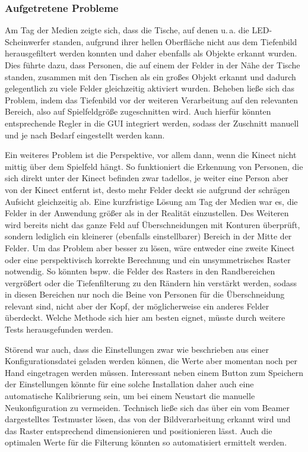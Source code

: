 \subsubsection{Aufgetretene Probleme}\label{ssec:problems}

Am Tag der Medien zeigte sich, dass die Tische, auf denen u.\,a. die LED-Scheinwerfer standen, aufgrund ihrer hellen Oberfläche nicht aus dem Tiefenbild herausgefiltert werden konnten und daher ebenfalls als Objekte erkannt wurden. Dies führte dazu, dass Personen, die auf einem der Felder in der Nähe der Tische standen, zusammen mit den Tischen als ein großes Objekt erkannt und dadurch gelegentlich zu viele Felder gleichzeitig aktiviert wurden. Beheben ließe sich das Problem, indem das Tiefenbild vor der weiteren Verarbeitung auf den relevanten Bereich, also auf Spielfeldgröße zugeschnitten wird. Auch hierfür könnten entsprechende Regler in die GUI integriert werden, sodass der Zuschnitt manuell und je nach Bedarf eingestellt werden kann.

Ein weiteres Problem ist die Perspektive, vor allem dann, wenn die Kinect nicht mittig über dem Spielfeld hängt. So funktioniert die Erkennung von Personen, die sich direkt unter der Kinect befinden zwar tadellos, je weiter eine Person aber von der Kinect entfernt ist, desto mehr Felder deckt sie aufgrund der schrägen Aufsicht gleichzeitig ab. Eine kurzfristige Lösung am Tag der Medien war es, die Felder in der Anwendung größer als in der Realität einzustellen. Des Weiteren wird bereits nicht das ganze Feld auf Überschneidungen mit Konturen überprüft, sondern lediglich ein kleinerer (ebenfalls einstellbarer) Bereich in der Mitte der Felder. Um das Problem aber besser zu lösen, wäre entweder eine zweite Kinect oder eine perspektivisch korrekte Berechnung und ein unsymmetrisches Raster notwendig. So könnten bspw. die Felder des Rasters in den Randbereichen vergrößert oder die Tiefenfilterung zu den Rändern hin verstärkt werden, sodass in diesen Bereichen nur noch die Beine von Personen für die Überschneidung relevant sind, nicht aber der Kopf, der möglicherweise ein anderes Felder überdeckt. Welche Methode sich hier am besten eignet, müsste durch weitere Tests herausgefunden werden.

Störend war auch, dass die Einstellungen zwar wie beschrieben aus einer Konfigurationsdatei geladen werden können, die Werte aber momentan noch per Hand eingetragen werden müssen. Interessant neben einem Button zum Speichern der Einstellungen könnte für eine solche Installation daher auch eine automatische Kalibrierung sein, um bei einem Neustart die manuelle Neukonfiguration zu vermeiden. Technisch ließe sich das über ein vom Beamer dargestelltes Testmuster lösen, das von der Bildverarbeitung erkannt wird und das Raster entsprechend dimensionieren und positionieren lässt. Auch die optimalen Werte für die Filterung könnten so automatisiert ermittelt werden.